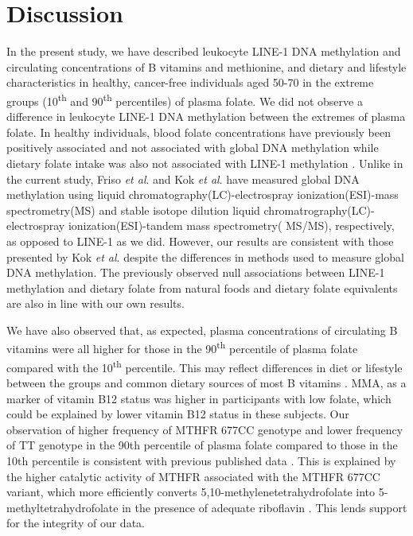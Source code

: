 \section[]{Discussion} %
\noindent In the present study, we have described leukocyte LINE-1 DNA methylation and circulating concentrations of B vitamins and methionine, and dietary and lifestyle characteristics in healthy, cancer-free individuals aged 50-70 in the extreme groups (10\textsuperscript{th} and 90\textsuperscript{th} percentiles) of plasma folate. We did not observe a difference in leukocyte LINE-1 DNA methylation between the extremes of plasma folate. In healthy individuals, blood folate concentrations have previously been positively associated \cite{c318} and not associated with global DNA methylation \cite{c319} while dietary folate intake was also not associated with LINE-1 methylation \cite{c317}. Unlike in the current study, Friso \emph{et al}. \cite{c318} and Kok \emph{et al}. \cite{c319} have measured global DNA methylation using liquid chromatography(LC)-electrospray ionization(ESI)-mass spectrometry(MS) and stable isotope dilution liquid chromatrography(LC)-electrospray ionization(ESI)-tandem mass spectrometry(
MS/MS), respectively, as opposed to LINE-1 as we did. However, our results are consistent with those presented by Kok \emph{et al}. despite the differences in methods used to measure global DNA methylation. The previously observed null associations between LINE-1 methylation and dietary folate from natural foods and dietary folate equivalents \cite{c317} are also in line with our own results.

\noindent We have also observed that, as expected, plasma concentrations of circulating B vitamins were all higher for those in the 90\textsuperscript{th} percentile of plasma folate compared with the 10\textsuperscript{th} percentile. This may reflect differences in diet or lifestyle between the groups and common dietary sources of most B vitamins \cite{c329}. MMA, as a marker of vitamin B12 status \cite{c330} was higher in participants with low folate, which could be explained by lower vitamin B12 status in these subjects. Our observation of higher frequency of MTHFR 677CC genotype and lower frequency of TT genotype in the 90th percentile of plasma folate compared to those in the 10th percentile is consistent with previous published data \cite{c318}. This is explained by the higher catalytic activity of MTHFR associated with the MTHFR 677CC variant, which more efficiently converts 5,10-methylenetetrahydrofolate into 5-methyltetrahydrofolate in the presence of adequate riboflavin \cite{c318}. This lends 
support for the integrity of our data.

